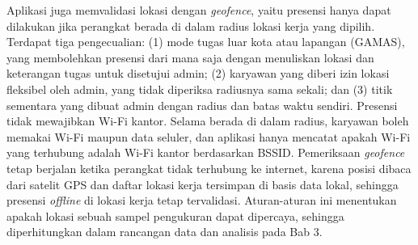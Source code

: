 Aplikasi juga memvalidasi lokasi dengan \textit{geofence}, yaitu presensi hanya dapat dilakukan jika perangkat berada di dalam radius lokasi kerja yang dipilih. Terdapat tiga pengecualian: (1) mode tugas luar kota atau lapangan (GAMAS), yang membolehkan presensi dari mana saja dengan menuliskan lokasi dan keterangan tugas untuk disetujui admin; (2) karyawan yang diberi izin lokasi fleksibel oleh admin, yang tidak diperiksa radiusnya sama sekali; dan (3) titik sementara yang dibuat admin dengan radius dan batas waktu sendiri. Presensi tidak mewajibkan Wi-Fi kantor. Selama berada di dalam radius, karyawan boleh memakai Wi-Fi maupun data seluler, dan aplikasi hanya mencatat apakah Wi-Fi yang terhubung adalah Wi-Fi kantor berdasarkan BSSID. Pemeriksaan \textit{geofence} tetap berjalan ketika perangkat tidak terhubung ke internet, karena posisi dibaca dari satelit GPS dan daftar lokasi kerja tersimpan di basis data lokal, sehingga presensi \textit{offline} di lokasi kerja tetap tervalidasi. Aturan-aturan ini menentukan apakah lokasi sebuah sampel pengukuran dapat dipercaya, sehingga diperhitungkan dalam rancangan data dan analisis pada Bab 3.

